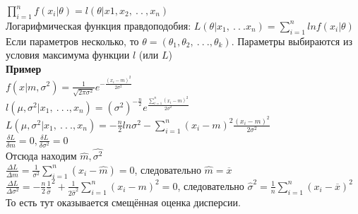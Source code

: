 \documentclass[russian, 12pt, fleqn]{article}
\begin{document}
$\displaystyle{\prod_{i = 1} ^ n} f(x_i|\theta) = l(\theta|x1,x_2,\ .\ .\ ,x_n)$\\
Логарифмическая функция правдоподобия: $L(\theta|x_1,\ .\ .\ . x_n) = \displaystyle{\sum \limits_{i = 1} ^ {n}} ln f(x_i|\theta)$\\
Если параметров несколько, то $\theta = (\theta_1, \theta_2, \ .\ .\ . ,\theta_k)$. Параметры выбираются из условия максимума функции $l$ (или $L$)\\
\textbf{Пример}\\ 
$f(x|m, \sigma^2) = \frac{1}{\sqrt{2\pi\sigma^2}} e^{-\frac{(x_i - m)^2}{2\sigma^2}}$\\
$l(\mu, \sigma^2|x_1, \ .\ .\ ., x_n) = (\sigma^2)^{-\frac{n}{2}}e^{\frac{\displaystyle{\sum \limits_{i = 1}^{n}(x_i - m)^2}}{2\sigma^2}}$\\
$L(\mu, \sigma^2|x_1, \ .\ .\ ., x_n) = - \frac{n}{2} ln \sigma^2 - \displaystyle{\sum \limits_{i = 1}^{n}}(x_i - m)^2\frac{(x_i - m)^2}{2\sigma^2}$\\
$\frac{\delta L}{\delta m} = 0, \frac{\delta L}{\delta \sigma^2} = 0$\\
Отсюда находим $\hat{m}, \hat{\sigma^2}$\\
$\frac{\Delta L}{\Delta m} = \frac{1}{\sigma^2} \displaystyle{\sum \limits _{i = 1} ^ {n} } (x_i - \hat{m}) = 0$, следовательно $\hat{m} = \overline{x}$\\
$\frac{\Delta L}{\Delta \sigma^2} = -\frac{n}{2} \frac{1}{\hat{\sigma}}^2 + \frac{1}{2\hat{\sigma}^2}  \displaystyle{\sum \limits _{i = 1} ^ {n} } (x_i - m)^2 = 0$, следовательно 
$\hat{\sigma}^2 = \frac{1}{n}  \displaystyle{\sum \limits _{i = 1} ^ {n} } (x_i - \overline{x})^2$\\
То есть тут оказывается смещённая оценка дисперсии.
\end{document}
